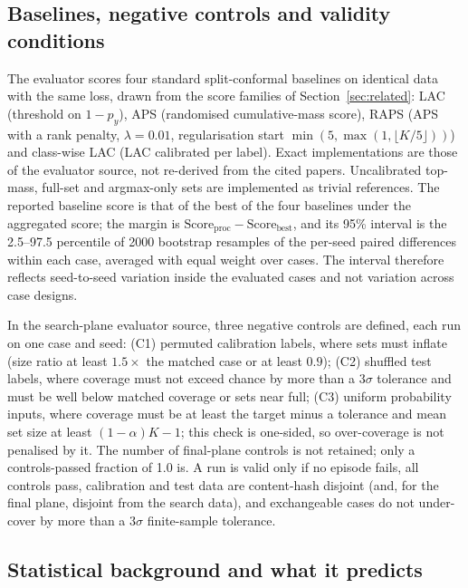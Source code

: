 \documentclass{article}
\newcommand{\score}{\mathrm{Score}}
\begin{document}
\subsection{Baselines, negative controls and validity conditions}
The evaluator scores four standard split-conformal baselines on identical data with the same loss, drawn from the score families of Section~\ref{sec:related}: LAC \citep{Sadinle2019Least} (threshold on $1-p_y$), APS \citep{Romano2020Classification} (randomised cumulative-mass score), RAPS \citep{Angelopoulos2020Uncertainty} (APS with a rank penalty, $\lambda=0.01$, regularisation start $\min(5,\max(1,\lfloor K/5\rfloor))$) and class-wise LAC (LAC calibrated per label). Exact implementations are those of the evaluator source, not re-derived from the cited papers. Uncalibrated top-mass, full-set and argmax-only sets are implemented as trivial references. The reported baseline score is that of the best of the four baselines under the aggregated score; the margin is $\score_{\mathrm{proc}}-\score_{\mathrm{best}}$, and its 95\% interval is the 2.5--97.5 percentile of 2000 bootstrap resamples of the per-seed paired differences within each case, averaged with equal weight over cases. The interval therefore reflects seed-to-seed variation inside the evaluated cases and not variation across case designs.

In the search-plane evaluator source, three negative controls are defined, each run on one case and seed: (C1) permuted calibration labels, where sets must inflate (size ratio at least $1.5\times$ the matched case or at least $0.9$); (C2) shuffled test labels, where coverage must not exceed chance by more than a $3\sigma$ tolerance and must be well below matched coverage or sets near full; (C3) uniform probability inputs, where coverage must be at least the target minus a tolerance and mean set size at least $(1-\alpha)K-1$; this check is one-sided, so over-coverage is not penalised by it. The number of final-plane controls is not retained; only a controls-passed fraction of 1.0 is. A run is valid only if no episode fails, all controls pass, calibration and test data are content-hash disjoint (and, for the final plane, disjoint from the search data), and exchangeable cases do not under-cover by more than a $3\sigma$ finite-sample tolerance.

\subsection{Statistical background and what it predicts}
\end{document}
